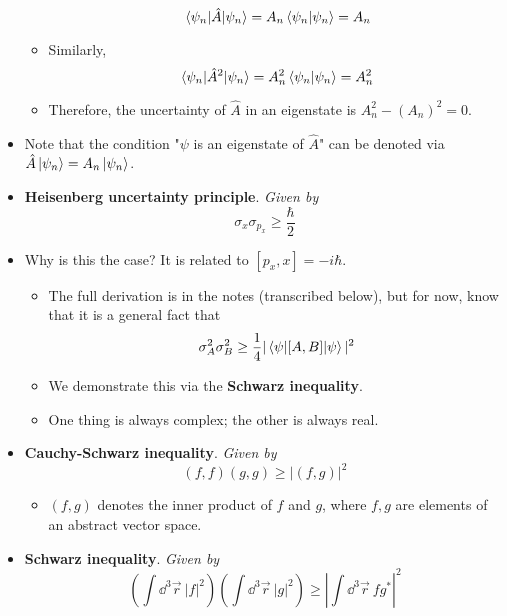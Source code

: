\documentclass[../notes.tex]{subfiles}
\begin{document}
\begin{itemize}
\begin{itemize}
        \begin{equation*}
            \ev{\hat{A}}{\psi_n} = A_n\braket{\psi_n} = A_n
        \end{equation*}
        \item Similarly,
        \begin{equation*}
            \ev{\hat{A}^2}{\psi_n} = A_n^2\braket{\psi_n} = A_n^2
        \end{equation*}
        \item Therefore, the uncertainty of $\hat{A}$ in an eigenstate is $A_n^2-(A_n)^2=0$.
    \end{itemize}
    \item Note that the condition "$\psi$ is an eigenstate of $\hat{A}$" can be denoted via $\hat{A}\ket{\psi_n}=A_n\ket{\psi_n}$.
    \item \textbf{Heisenberg uncertainty principle}. \emph{Given by}
    \begin{equation*}
        \sigma_x\sigma_{p_x} \geq \frac{\hbar}{2}
    \end{equation*}
    \item Why is this the case? It is related to $[p_x,x]=-i\hbar$.
    \begin{itemize}
        \item The full derivation is in the notes (transcribed below), but for now, know that it is a general fact that
        \begin{equation*}
            \sigma_A^2\sigma_B^2 \geq \frac{1}{4}|\ev{[A,B]}{\psi}|^2
        \end{equation*}
        \item We demonstrate this via the \textbf{Schwarz inequality}.
        \item One thing is always complex; the other is always real.
    \end{itemize}
    \item \textbf{Cauchy-Schwarz inequality}. \emph{Given by}
    \begin{equation*}
        (f,f)(g,g) \geq |(f,g)|^2
    \end{equation*}
    \begin{itemize}
        \item $(f,g)$ denotes the inner product of $f$ and $g$, where $f,g$ are elements of an abstract vector space.
    \end{itemize}
    \item \textbf{Schwarz inequality}. \emph{Given by}
    \begin{equation*}
        \left( \int\dd^3\vec{r}\ |f|^2 \right)\left( \int\dd^3\vec{r}\ |g|^2 \right) \geq \left| \int\dd^3\vec{r}\ fg^* \right|^2

\end{equation*}
\end{itemize}
\end{document}

